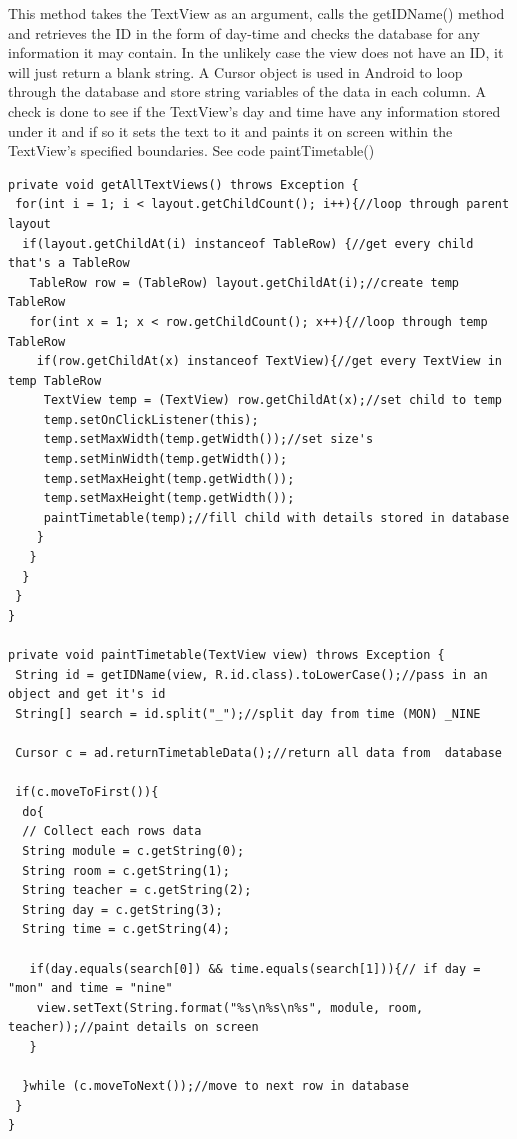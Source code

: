 This method takes the TextView as an argument, calls the getIDName() method and retrieves the ID in the form of day-time and checks the database for any information it may contain. In the unlikely case the view does not have an ID, it will just return a blank string. A Cursor object is used in Android to loop through the database and store string variables of the data in each column. A check is done to see if the TextView's day and time have any information stored under it and if so it sets the text to it and paints it on screen within the TextView's specified boundaries. See code paintTimetable()
\pagebreak

\begin{verbatim}
private void getAllTextViews() throws Exception {
 for(int i = 1; i < layout.getChildCount(); i++){//loop through parent layout
  if(layout.getChildAt(i) instanceof TableRow) {//get every child that's a TableRow
   TableRow row = (TableRow) layout.getChildAt(i);//create temp TableRow
   for(int x = 1; x < row.getChildCount(); x++){//loop through temp TableRow
    if(row.getChildAt(x) instanceof TextView){//get every TextView in temp TableRow
     TextView temp = (TextView) row.getChildAt(x);//set child to temp
 	 temp.setOnClickListener(this);
	 temp.setMaxWidth(temp.getWidth());//set size's
	 temp.setMinWidth(temp.getWidth());		
	 temp.setMaxHeight(temp.getWidth());
	 temp.setMaxHeight(temp.getWidth());		
	 paintTimetable(temp);//fill child with details stored in database
    }
   }
  }
 }
}

private void paintTimetable(TextView view) throws Exception {
 String id = getIDName(view, R.id.class).toLowerCase();//pass in an object and get it's id
 String[] search = id.split("_");//split day from time (MON) _NINE
 
 Cursor c = ad.returnTimetableData();//return all data from  database
 
 if(c.moveToFirst()){
  do{
  // Collect each rows data
  String module = c.getString(0);
  String room = c.getString(1);
  String teacher = c.getString(2);
  String day = c.getString(3);
  String time = c.getString(4);
 
   if(day.equals(search[0]) && time.equals(search[1])){// if day = "mon" and time = "nine"
    view.setText(String.format("%s\n%s\n%s", module, room, teacher));//paint details on screen
   }
 
  }while (c.moveToNext());//move to next row in database
 }
}
\end{verbatim}

